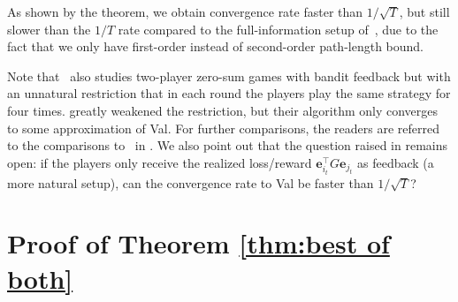 As shown by the theorem, we obtain convergence rate faster than $1/\sqrt{T}$,
but still slower than the $1/T$ rate compared to the full-information setup of~\citep{rakhlin2013optimization, syrgkanis2015fast},
due to the fact that we only have first-order instead of second-order path-length bound.

Note that~\citet{rakhlin2013optimization} also studies two-player zero-sum games with bandit feedback
but with an unnatural restriction that in each round the players play the same strategy for four times.
\citet{foster2016learning} greatly weakened the restriction, but their algorithm only converges to some approximation of Val.
For further comparisons, the readers are referred to the comparisons to~\citep{syrgkanis2015fast}
in \citep{foster2016learning}.
We also point out that the question raised in \citep{rakhlin2013optimization} remains open: if the players only receive the realized loss/reward $\mathbf{e}_{i_t}^\top G\mathbf{e}_{j_t}$ as feedback (a more natural setup), can the convergence rate to Val be faster than $1/\sqrt{T}$?

\section{Proof of Theorem \ref{thm:best of both}}


